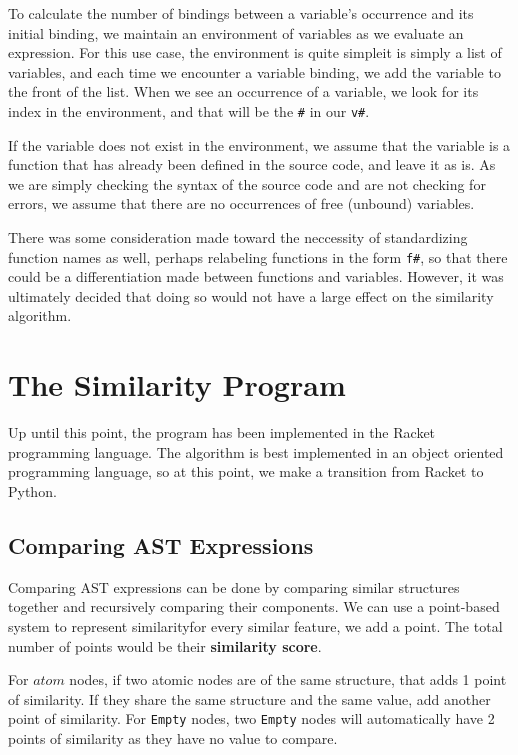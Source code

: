 \documentclass[12pt]{article}
\newcommand{\itm}[1]{\ensuremath{\mathit{#1}}}
\newcommand{\key}[1]{\texttt{#1}}
\newcommand{\Atm}[0]{\itm{atom}}
\begin{document}
\hfill

To calculate the number of bindings between a variable's occurrence and its initial binding, we maintain an environment of variables as we evaluate an expression. For this use case, the environment is quite simple\textemdash it is simply a list of variables, and each time we encounter a variable binding, we add the variable to the front of the list. When we see an occurrence of a variable, we look for its index in the environment, and that will be the \key{\#} in our \key{v\#}.

\hfill

If the variable does not exist in the environment, we assume that the variable is a function that has already been defined in the source code, and leave it as is. As we are simply checking the syntax of the source code and are not checking for errors, we assume that there are no occurrences of free (unbound) variables.

\hfill

There was some consideration made toward the neccessity of standardizing function names as well, perhaps relabeling functions in the form \key{f\#}, so that there could be a differentiation made between functions and variables. However, it was ultimately decided that doing so would not have a large effect on the similarity algorithm.

\section{The Similarity Program}

Up until this point, the program has been implemented in the Racket programming language. The algorithm is best implemented in an object oriented programming language, so at this point, we make a transition from Racket to Python.

\subsection{Comparing AST Expressions}

Comparing AST expressions can be done by comparing similar structures together and recursively comparing their components. We can use a point-based system to represent similarity\textemdash for every similar feature, we add a point. The total number of points would be their \textbf{similarity score}.

\hfill

For \Atm{} nodes, if two atomic nodes are of the same structure, that adds 1 point of similarity. If they share the same structure and the same value, add another point of similarity. For \key{Empty} nodes, two \key{Empty} nodes will automatically have 2 points of similarity as they have no value to compare.
\end{document}
